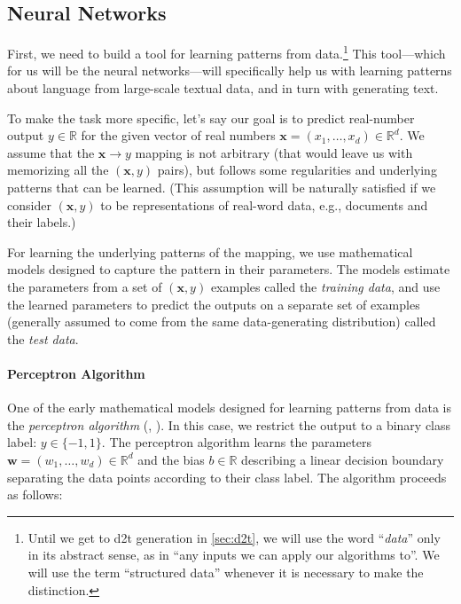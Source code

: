 \subsection{Neural Networks}
\label{sec:nns}
First, we need to build a tool for learning patterns from data.\footnote{Until we get to \ac{d2t} generation in \autoref{sec:d2t}, we will use the word ``\textit{data}'' only in its abstract sense, as in ``any inputs we can apply our algorithms to''. We will use the term ``structured data'' whenever it is necessary to make the distinction.} This tool---which for us will be the neural networks---will specifically help us with learning patterns about language from large-scale textual data, and in turn with generating text.

To make the task more specific, let's say our goal is to predict real-number output $y \in \mathbb{R}$ for the given vector of real numbers $\mathbf{x} = (x_1, \ldots, x_d) \in \mathbb{R}^d$.
We assume that the $\mathbf{x} \rightarrow y$ mapping is not arbitrary (that would leave us with memorizing all the $(\mathbf{x},y)$ pairs), but follows some regularities and underlying patterns that can be learned. (This assumption will be naturally satisfied if we consider $(\mathbf{x},y)$ to be representations of real-word data, e.g., documents and their labels.)

For learning the underlying patterns of the mapping, we use mathematical models designed to capture the pattern in their parameters. The models estimate the parameters from a set of $(\mathbf{x},y)$ examples called the \textit{training data}, and use the learned parameters to predict the outputs on a separate set of examples (generally assumed to come from the same data-generating distribution) called the \textit{test data}.

\paragraph{Perceptron Algorithm} One of the early mathematical models designed for learning patterns from data is the \emph{perceptron algorithm} (\citealp{rosenblatt1958perceptron}, \citealp[p.~192]{bishop2006pattern}). In this case, we restrict the output to a binary class label: $y \in \{-1, 1\}$. The perceptron algorithm learns the parameters $\textbf{w} = (w_1, \ldots, w_d) \in \mathbb{R}^d$ and the bias $b \in \mathbb{R}$ describing a linear decision boundary separating the data points according to their class label. The algorithm proceeds as follows:


